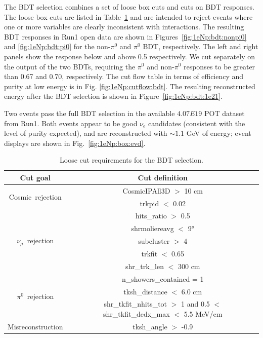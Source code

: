 The BDT selection combines a set of loose box cuts and cuts on BDT responses. The loose box cuts are listed in Table~\ref{tab:1eNp:loosecut} and are intended to reject events where one or more variables are clearly inconsistent with \nuecc interactions. The resulting BDT responses in Run1 open data are shown in Figures~\ref{fig:1eNp:bdt:nonpi0} and \ref{fig:1eNp:bdt:pi0} for the non-$\pi^0$ and $\pi^0$ BDT, respectively. The left and right panels show the response below and above 0.5 respectively. We cut separately on the output of the two BDTs, requiring the $\pi^0$ and non-$\pi^0$ responses to be greater than 0.67 and 0.70, respectively. The cut flow table in terms of efficiency and purity at low energy is in Fig. \ref{fig:1eNp:cutflow:bdt}. The resulting reconstructed \nue energy after the BDT selection is shown in Figure~\ref{fig:1eNp:bdt:1e21}. %

Two events pass the full BDT selection in the available $4.07E19$ POT dataset from Run1. Both events appear to be good $\nu_e$ candidates (consistent with the level of purity expected), and are reconstructed with $\sim 1.1$ GeV of energy; event displays are shown in Fig.~\ref{fig:1eNp:box:evd}.


\begin{table}[h!]
\centering
\setlength{\tabcolsep}{10pt}
\renewcommand{\arraystretch}{1.25}
 \begin{tabular}{| c | c |} 
 \hline
 Cut goal & Cut definition \\
 \hline\hline
\multirow{2}{*}{Cosmic~rejection} & CosmicIPAll3D $>$ 10 \si{\cm} \\
& trkpid $<$ 0.02 \\
 \hline
\multirow{5}{*}{$\nu_\mu$~rejection} & hits\_ratio $>$ 0.5 \\
& shrmoliereavg $<$ 9\si{\degree} \\
& subcluster $>$ 4 \\
& trkfit $<$ 0.65 \\
& shr\_trk\_len $<$ 300 cm \\
 \hline
\multirow{3}{*}{$\pi^0$~rejection} & n\_showers\_contained = 1 \\
& tksh\_distance $<$ 6.0 \si{\cm} \\
& shr\_tkfit\_nhits\_tot $>$ 1 and 0.5 $<$ shr\_tkfit\_dedx\_max $<$ 5.5 \si{\MeV}/\si{\cm} \\
 \hline
Misreconstruction & tksh\_angle $>$ -0.9 \\
 \hline
 \end{tabular}
 \caption{\label{tab:1eNp:loosecut} Loose cut requirements for the \npsel BDT selection.}
\end{table}

